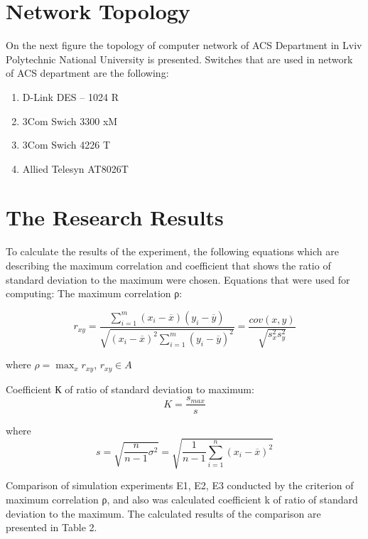 \documentclass[runningheads,a4paper]{llncs}
\begin{document}
\section{Network Topology}
On the next figure the topology of computer network of ACS Department in Lviv Polytechnic National University is presented. Switches that are used in network of ACS department are the following:
\begin{enumerate}
  \item D-Link DES – 1024 R
  \item 3Com Swich 3300 xM
  \item 3Com Swich 4226 T
  \item Allied Telesyn AT8026T
\end{enumerate}


\section{The Research Results}

To calculate the results of the experiment, the following equations which are describing the maximum correlation and coefficient that shows the ratio of standard deviation to the maximum were chosen.
Equations that were used for computing:
The maximum correlation ρ:

\begin{equation}
r_{xy} = \frac{ \sum_{i=1}^{m} (x_i - \overline{x})(y_i - \overline{y}) }{ \sqrt{(x_i - \overline{x}) ^ 2 \sum_{i=1}^{m} (y_i - \overline{y})^2 }} = \frac{cov(x,y)}{\sqrt{s_x^2 s_y^2}}
\end{equation}

where $\rho = \max_{x} r_{xy}$,  $r_{xy} \in A$

Coefficient  К of ratio of standard deviation to maximum:
\begin{equation}
K = \frac{s_{max}}{s}
\end{equation}

where
\begin{equation}
s = \sqrt{ \frac{n}{n-1} \sigma ^2 } = \sqrt{ \frac{1}{n-1} \sum_{i=1}^n (x_i - \overline{x})^2}
\end{equation}

Comparison of simulation experiments E1, E2, E3 conducted by the criterion of maximum correlation ρ, and also was calculated coefficient k of ratio of standard deviation to the maximum. The calculated results of the comparison are presented in Table 2.
\end{document}
